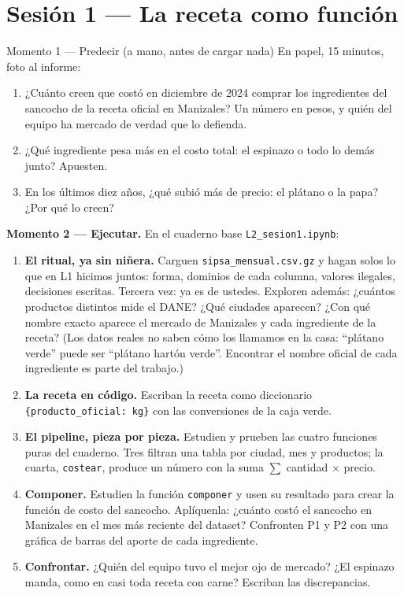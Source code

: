 \documentclass[12pt,letterpaper]{article}
\begin{document}
\section{Sesión 1 --- La receta como función}

\begin{cajaprediccion}{Momento 1 --- Predecir (a mano, antes de cargar nada)}
En papel, 15 minutos, foto al informe:
\begin{enumerate}[label=P\arabic*., itemsep=0.1em]
    \item ¿Cuánto creen que costó en diciembre de 2024 comprar los ingredientes del sancocho de la receta oficial en Manizales? Un número en pesos, y quién del equipo ha mercado de verdad que lo defienda.
    \item ¿Qué ingrediente pesa más en el costo total: el espinazo o todo lo demás junto? Apuesten.
    \item En los últimos diez años, ¿qué subió más de precio: el plátano o la papa? ¿Por qué lo creen?
\end{enumerate}
\end{cajaprediccion}

\textbf{Momento 2 --- Ejecutar.} En el cuaderno base \texttt{L2\_sesion1.ipynb}:

\begin{enumerate}[label=\arabic*.]
    \item \textbf{El ritual, ya sin niñera.} Carguen \texttt{sipsa\_mensual.csv.gz} y hagan solos lo que en L1 hicimos juntos: forma, dominios de cada columna, valores ilegales, decisiones escritas. Tercera vez: ya es de ustedes. Exploren además: ¿cuántos productos distintos mide el DANE? ¿Qué ciudades aparecen? ¿Con qué nombre exacto aparece el mercado de Manizales y cada ingrediente de la receta? (Los datos reales no saben cómo los llamamos en la casa: ``plátano verde'' puede ser ``plátano hartón verde''. Encontrar el nombre oficial de cada ingrediente es parte del trabajo.)
    \item \textbf{La receta en código.} Escriban la receta como diccionario \texttt{\{producto\_oficial: kg\}} con las conversiones de la caja verde.
    \item \textbf{El pipeline, pieza por pieza.} Estudien y prueben las cuatro funciones puras del cuaderno. Tres filtran una tabla por ciudad, mes y productos; la cuarta, \texttt{costear}, produce un número con la suma $\sum$ cantidad $\times$ precio.
    \item \textbf{Componer.} Estudien la función \texttt{componer} y usen su resultado para crear la función de costo del sancocho. Aplíquenla: ¿cuánto costó el sancocho en Manizales en el mes más reciente del dataset? Confronten P1 y P2 con una gráfica de barras del aporte de cada ingrediente.
    \item \textbf{Confrontar.} ¿Quién del equipo tuvo el mejor ojo de mercado? ¿El espinazo manda, como en casi toda receta con carne? Escriban las discrepancias.
\end{enumerate}
\end{document}
